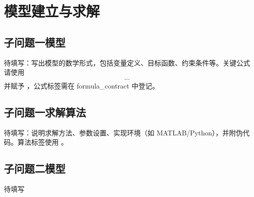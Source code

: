 \section{模型建立与求解}\label{sec:model}

\subsection{子问题一模型}\label{sec:model_sub1}
待填写：写出模型的数学形式，包括变量定义、目标函数、约束条件等。关键公式请使用 \begin{align} ... \end{align} 并赋予 \label{eq:xxx}，公式标签需在 formula_contract 中登记。

\subsection{子问题一求解算法}\label{sec:alg_sub1}
待填写：说明求解方法、参数设置、实现环境（如 MATLAB/Python），并附伪代码。算法标签使用 \label{alg:xxx}。

\subsection{子问题二模型}\label{sec:model_sub2}
待填写

